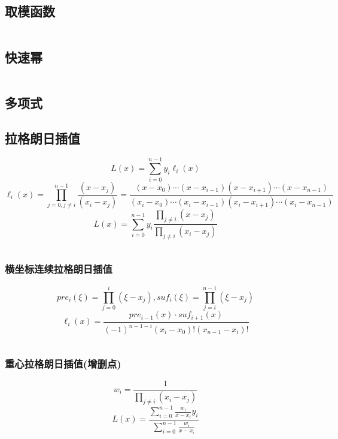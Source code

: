 \documentclass[utf8]{ctexart}
\newcommand{\cpp}[1]{\inputminted[linenos,breaklines,tabsize=4,mathescape]{c++}{#1}}
\begin{document}
\subsection{取模函数}
\cpp{codes/math/mod.cpp}

\subsection{快速幂}
\cpp{codes/math/power.cpp}


\subsection{多项式}

\subsection{拉格朗日插值}

$$L(x) = \sum_{i=0}^{n-1} y_i \ell_i(x)$$
$$\ell_i(x) = \prod_{j=0,j\ne i}^{n-1} \frac{(x - x_j)}{(x_i - x_j)} = \frac{(x - x_0) \cdots (x - x_{i-1})(x - x_{i+1}) \cdots (x - x_{n-1})}{(x_i - x_0) \cdots (x_i - x_{i-1})(x_i - x_{i+1}) \cdots (x_i - x_{n-1})}$$
$$L(x) = \sum_{i=0}^{n-1} y_i \frac{\prod \limits_{j \ne i} (x - x_j)}{\prod \limits_{j \ne i} (x_i - x_j)}$$

\cpp{codes/math/polynomial/lagrange.cpp}

\subsubsection{横坐标连续拉格朗日插值}

$$pre_i(\xi) = \prod_{j=0}^i (\xi - x_j), suf_i(\xi) = \prod_{j=i}^{n-1} (\xi - x_j)$$
$$\ell_i(x) = \frac{pre_{i-1}(x) \cdot suf_{i+1}(x)}{(-1)^{n-1-i}(x_i - x_0)! (x_{n-1} - x_i)!}$$

\cpp{codes/math/polynomial/lagrange-consecutive.cpp}

\subsubsection{重心拉格朗日插值(增删点)}

$$w_i = \frac{1}{\prod_{j \ne i}(x_i - x_j)}$$
$$L(x) = \frac{\sum_{i=0}^{n-1}\frac{w_i}{x-x_i}y_i}{\sum_{i=0}^{n-1}\frac{w_i}{x-x_i}}$$
\end{document}
